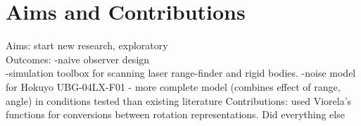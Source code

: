 \chapter*{Aims and Contributions}

Aims: start new research, exploratory\\
Outcomes:
-naive observer design\\
-simulation toolbox for scanning laser range-finder and rigid bodies.
-noise model for Hokuyo UBG-04LX-F01 - more complete model (combines effect of range, angle) in conditions tested than existing literature
Contributions: used Viorela's functions for conversions between rotation representations. Did everything else